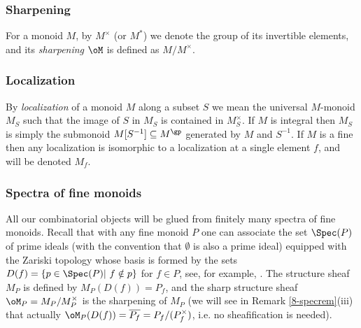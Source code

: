\documentclass[10pt]{../fichiers-configuration-latex/smfart}
\begin{document}
\subsubsection{Sharpening}\label{8-notmonsec} For a monoid $M$,
by $M^\times$ (or $M^*$) we denote the group of its invertible
elements, and its {\em sharpening} $\oM$ is defined as $M/M^\times$.

\subsubsection{Localization}\label{8-localmonsec} By {\em
localization} of a monoid $M$ along a subset $S$ we mean the
universal $M$-monoid $M_S$ such that the image of $S$ in $M_S$
is contained in $M_S^\times$. If $M$ is integral then $M_S$ is
simply the submonoid $M[S^{-1}]\subseteq M^\gp$ generated by $M$
and $S^{-1}$. If $M$ is a fine then any localization is isomorphic
to a localization at a single element $f$, and will be denoted $M_f$.

\subsubsection{Spectra of fine monoids}\label{8-specmonoidsec} All
our combinatorial objects will be glued from finitely many spectra of
fine monoids. Recall that with any fine monoid $P$ one can associate
the set $\Spec(P)$ of prime ideals (with the convention that
$\emptyset$ is also a prime ideal) equipped with the Zariski topology
whose basis is formed by the sets $D(f)=\{p\in\Spec(P)|\ f\notin
p\}$ for $f\in P$, see, for example, \cite[\S9]{Toric@Kato}. The
structure sheaf ${M}_P$ is defined by ${M}_P(D(f))=P_f$, and the
sharp structure sheaf $\oM_P={M}_P/{M}_P^\times$ is the sharpening
of ${M}_P$ (we will see in Remark \ref{8-specrem}(iii) that actually
$\oM_P(D(f))=\overline{P_f}=P_f/(P_f^\times)$, i.e. no sheafification
is needed).
\end{document}
